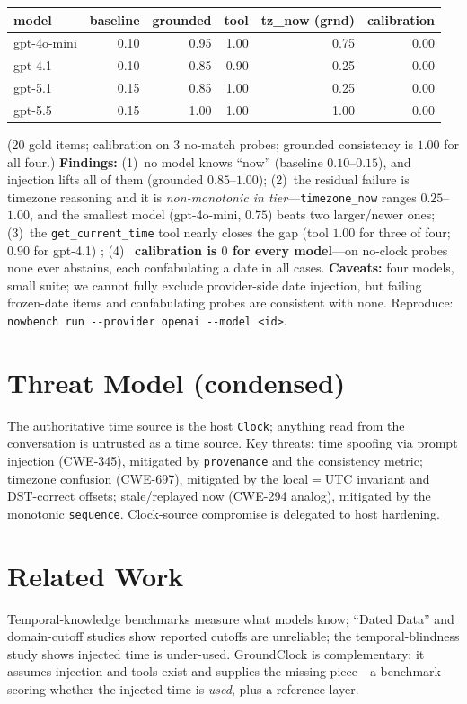 \documentclass[11pt]{article}
\begin{document}
\begin{center}
\begin{tabular}{lrrrrr}
\toprule
model & baseline & grounded & tool & tz\_now (grnd) & calibration \\
\midrule
gpt-4o-mini & 0.10 & 0.95 & 1.00 & 0.75 & 0.00 \\
gpt-4.1 & 0.10 & 0.85 & 0.90 & 0.25 & 0.00 \\
gpt-5.1 & 0.15 & 0.85 & 1.00 & 0.25 & 0.00 \\
gpt-5.5 & 0.15 & 1.00 & 1.00 & 1.00 & 0.00 \\
\bottomrule
\end{tabular}
\end{center}

\noindent (20 gold items; calibration on 3 no-match probes; grounded consistency is $1.00$ for all
four.) \textbf{Findings:} (1)~no model knows ``now'' (baseline $0.10$--$0.15$), and injection lifts
all of them (grounded $0.85$--$1.00$); (2)~the residual failure is timezone reasoning and it is
\emph{non-monotonic in tier}---\texttt{timezone\_now} ranges $0.25$--$1.00$, and the smallest model
(gpt-4o-mini, $0.75$) beats two larger/newer ones; (3)~the \texttt{get\_current\_time} tool nearly
closes the gap (tool $1.00$ for three of four; $0.90$ for gpt-4.1) \cite{span2025}; (4)~\textbf{
calibration is $0$ for every model}---on no-clock probes none ever abstains, each confabulating a
date in all cases. \textbf{Caveats:} four models, small suite; we cannot fully exclude provider-side
date injection, but failing frozen-date items and confabulating probes are consistent with none.
Reproduce: \texttt{nowbench run -{}-provider openai -{}-model <id>}.

\section{Threat Model (condensed)}
The authoritative time source is the host \texttt{Clock}; anything read from the conversation is
untrusted as a time source. Key threats: time spoofing via prompt injection (CWE-345), mitigated by
\texttt{provenance} and the consistency metric; timezone confusion (CWE-697), mitigated by the
local$=$UTC invariant and DST-correct offsets; stale/replayed now (CWE-294 analog), mitigated by the
monotonic \texttt{sequence}. Clock-source compromise is delegated to host hardening.

\section{Related Work}
Temporal-knowledge benchmarks \cite{chen2021timeqa,tan2023tempreason,span2025} measure
what models know; ``Dated Data'' \cite{cheng2024dated} and domain-cutoff studies
\cite{shah2025cutoff} show reported cutoffs are unreliable; the temporal-blindness study
\cite{blindness2025} shows injected time is under-used.
GroundClock is complementary: it assumes injection and tools exist and supplies the missing
piece---a benchmark scoring whether the injected time is \emph{used}, plus a reference layer.
\end{document}
